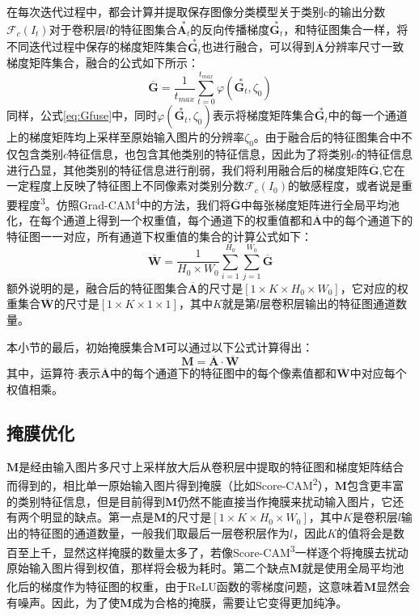在每次迭代过程中，都会计算并提取保存图像分类模型关于类别c的输出分数$\mathcal{F}_c(I_t)$对于卷积层$l$的特征图集合$\overset{*}{\boldsymbol{A}_t}$的反向传播梯度$\overset{*}{\boldsymbol{G}_t}$，和特征图集合一样，将不同迭代过程中保存的梯度矩阵集合$\overset{*}{\boldsymbol{G}_t}$也进行融合，可以得到$\overline{\bm{A}}$分辨率尺寸一致梯度矩阵集合，融合的公式如下所示：
\begin{equation}
	\overline{\bm{G}}=\frac{1}{t_{max}}\sum_{t=0}^{t_{max}}\varphi(\overset{*}{\boldsymbol{G}_t},\zeta_0)
	\label{eq:Gfuse}
\end{equation}
同样，公式\ref{eq:Gfuse}中，同时$\varphi(\overset{*}{\boldsymbol{G}_t},\zeta_0)$表示将梯度矩阵集合$\overset{*}{\boldsymbol{G}_t}$中的每一个通道上的梯度矩阵均上采样至原始输入图片的分辨率$\zeta_0$。由于融合后的特征图集合中不仅包含类别$c$特征信息，也包含其他类别的特征信息，因此为了将类别$c$的特征信息进行凸显，其他类别的特征信息进行削弱，我们将利用融合后的梯度矩阵$\overline{\bm{G}}$,它在一定程度上反映了特征图上不同像素对类别分数$\mathcal{F}_c(I_0)$的敏感程度，或者说是重要程度\textsuperscript{\cite{selvaraju2017grad}3}。仿照Grad-CAM\textsuperscript{\cite{selvaraju2017grad}4}中的方法，我们将$\overline{\bm{G}}$中每张梯度矩阵进行全局平均池化，在每个通道上得到一个权重值，每个通道下的权重值都和$\overline{\bm{A}}$中的每个通道下的特征图一一对应，所有通道下权重值的集合的计算公式如下：
\begin{equation}
	\overline{\bm{W}}=\frac{1}{H_0\times W_0}\sum_{i=1}^{H_0}\sum_{j=1}^{W_0}\overline{\bm{G}}
	\label{eq:Wfuse}
\end{equation}
额外说明的是，融合后的特征图集合$\overline{\bm{A}}$的尺寸是$[1\times K \times H_0\times W_0]$，它对应的权重集合$\overline{\bm{W}}$的尺寸是$[1\times K \times 1\times 1]$，其中$K$就是第$l$层卷积层输出的特征图通道数量。

本小节的最后，初始掩膜集合$\boldsymbol{M}$可以通过以下公式计算得出：
\begin{equation}
	\boldsymbol{M}=	\overline{\bm{A}}\cdot\overline{\bm{W}}
\end{equation}
其中，运算符$\cdot$表示$\overline{\bm{A}}$中的每个通道下的特征图中的每个像素值都和$\overline{\boldsymbol{W}}$中对应每个权值相乘。

\subsection{掩膜优化}
$\boldsymbol{M}$是经由输入图片多尺寸上采样放大后从卷积层中提取的特征图和梯度矩阵结合而得到的，相比单一原始输入图片得到掩膜（比如Score-CAM\textsuperscript{\cite{wang2020score}2}），$\boldsymbol{M}$包含更丰富的类别特征信息，但是目前得到$\boldsymbol{M}$仍然不能直接当作掩膜来扰动输入图片，它还有两个明显的缺点。第一点是$\boldsymbol{M}$的尺寸是$[1\times K \times H_0\times W_0]$，其中$K$是卷积层$l$输出的特征图的通道数量，一般我们取最后一层卷积层作为$l$，因此$K$的值将会是数百至上千，显然这样掩膜的数量太多了，若像Score-CAM\textsuperscript{\cite{wang2020score}3}一样逐个将掩膜去扰动原始输入图片得到权值，那样将会极为耗时。第二个缺点$\boldsymbol{M}$就是使用全局平均池化后的梯度作为特征图的权重，由于ReLU函数的零梯度问题\textsuperscript{\cite{zhang2021novel}}，这意味着$\boldsymbol{M}$显然会有噪声。因此，为了使$\boldsymbol{M}$成为合格的掩膜，需要让它变得更加纯净。

